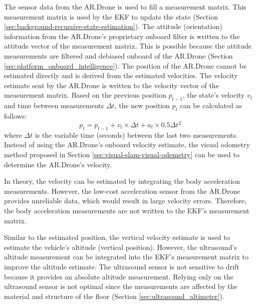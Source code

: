 The sensor data from the AR.Drone is used to fill a measurement matrix.
This measurement matrix is used by the EKF to update the state (Section \ref{sec:background-recursive-state-estimation}).
The attitude (orientation) information from the AR.Drone's proprietary onboard filter is written to the attitude vector of the measurement matrix.
This is possible because the attitude measurements are filtered and debiased onboard of the AR.Drone (Section \ref{sec:platform_onboard_intelligence}).
The position of the AR.Drone cannot be estimated directly and is derived from the estimated velocities.
The velocity estimate sent by the AR.Drone is written to the velocity vector of the measurement matrix.
Based on the previous position $p_{t-1}$, the state's velocity $v_{t}$ and time between measurements $\Delta t$, the new position $p_{t}$ can be calculated as follows:
\begin{equation}
p_{t} = p_{t-1} + v_{t} \times \Delta t + a_{t} \times 0.5 \Delta t^2
\end{equation}
where $\Delta t$ is the variable time (seconds) between the last two measurements.
Instead of using the AR.Drone's onboard velocity estimate, the visual odometry method proposed in Section \ref{sec:visual-slam-visual-odemetry} can be used to determine the AR.Drone's velocity.

In theory, the velocity can be estimated by integrating the body acceleration measurements.
However, the low-cost acceleration sensor from the AR.Drone provides unreliable data, which would result in large velocity errors.
Therefore, the body acceleration measurements are not written to the EKF's measurement matrix.

Similar to the estimated position, the vertical velocity estimate is used to estimate the vehicle's altitude (vertical position).
However, the ultrasound's altitude measurement can be integrated into the EKF's measurement matrix to improve the altitude estimate.
The ultrasound sensor is not sensitive to drift because it provides an absolute altitude measurement.
Relying only on the ultrasound sensor is not optimal since the measurements are affected by the material and structure of the floor (Section \ref{sec:ultrasound_altimeter}).


